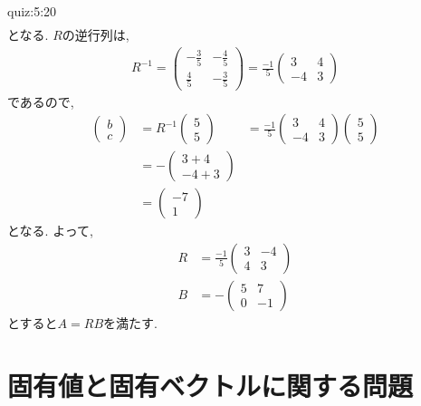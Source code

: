 \begin{answerof}{quiz:5:20}
\begin{align*}
 \end{align*}
 となる.  $R$の逆行列は,
 \begin{align*}
   R^{-1}=
 \begin{pmatrix}-\frac{3}{5}&-\frac{4}{5}\\\frac{4}{5}&-\frac{3}{5}\end{pmatrix}
=\frac{-1}{5} \begin{pmatrix}3&4\\-4&3\end{pmatrix}
 \end{align*}
 であるので,
\begin{align*}
  \begin{pmatrix}b\\c\end{pmatrix}
    &=R^{-1}\begin{pmatrix}5\\5\end{pmatrix}
    &=\frac{-1}{5} \begin{pmatrix}3&4\\-4&3\end{pmatrix}\begin{pmatrix}5\\5\end{pmatrix}\\
    &=-\begin{pmatrix}3+4\\-4+3\end{pmatrix}\\
    &=\begin{pmatrix}-7\\1\end{pmatrix}
 \end{align*}
となる.
よって,
\begin{align*}
  R&=\frac{-1}{5}\begin{pmatrix}3&-4\\4&3\end{pmatrix}\\
  B&=-\begin{pmatrix}5&7\\0&-1\end{pmatrix}
\end{align*}
 とすると$A=RB$を満たす.
\end{answerof}


\section{固有値と固有ベクトルに関する問題}

